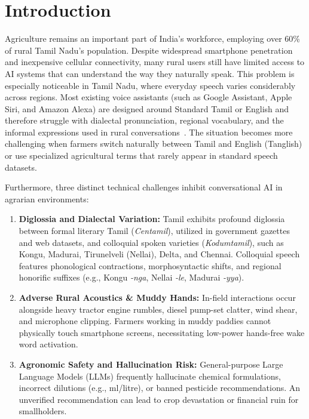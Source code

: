 \documentclass[conference]{IEEEtran}
\begin{document}
\section{Introduction}
Agriculture remains an important part of India's workforce, employing over 60\% of rural Tamil Nadu's population. Despite widespread smartphone penetration and inexpensive cellular connectivity, many rural users still have limited access to AI systems that can understand the way they naturally speak. This problem is especially noticeable in Tamil Nadu, where everyday speech varies considerably across regions. Most existing voice assistants (such as Google Assistant, Apple Siri, and Amazon Alexa) are designed around Standard Tamil or English and therefore struggle with dialectal pronunciation, regional vocabulary, and the informal expressions used in rural conversations~\cite{ramakrishnan2019phoneme}. The situation becomes more challenging when farmers switch naturally between Tamil and English (Tanglish) or use specialized agricultural terms that rarely appear in standard speech datasets.

Furthermore, three distinct technical challenges inhibit conversational AI in agrarian environments:
\begin{enumerate}
    \item \textbf{Diglossia and Dialectal Variation:} Tamil exhibits profound diglossia between formal literary Tamil (\textit{Centamil}), utilized in government gazettes and web datasets, and colloquial spoken varieties (\textit{Kodumtamil}), such as Kongu, Madurai, Tirunelveli (Nellai), Delta, and Chennai. Colloquial speech features phonological contractions, morphosyntactic shifts, and regional honorific suffixes (e.g., Kongu \textit{-nga}, Nellai \textit{-le}, Madurai \textit{-yya}).
    \item \textbf{Adverse Rural Acoustics \& Muddy Hands:} In-field interactions occur alongside heavy tractor engine rumbles, diesel pump-set clatter, wind shear, and microphone clipping. Farmers working in muddy paddies cannot physically touch smartphone screens, necessitating low-power hands-free wake word activation.
    \item \textbf{Agronomic Safety and Hallucination Risk:} General-purpose Large Language Models (LLMs) frequently hallucinate chemical formulations, incorrect dilutions (e.g., ml/litre), or banned pesticide recommendations. An unverified recommendation can lead to crop devastation or financial ruin for smallholders.
\end{enumerate}
\end{document}
